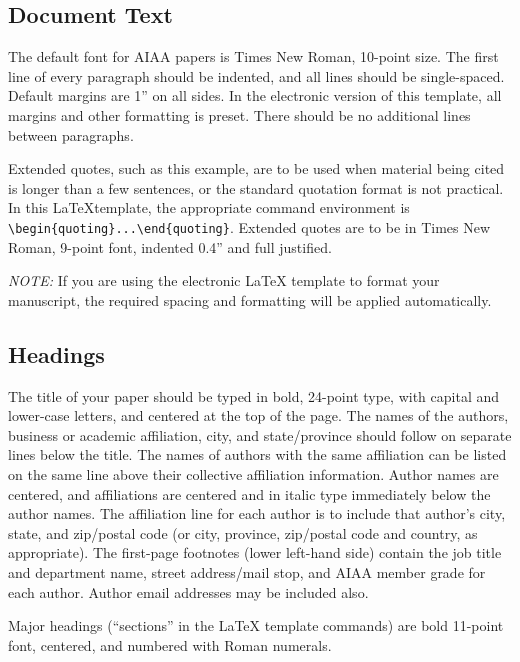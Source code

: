 \documentclass[conf]{new-aiaa}
\begin{document}
    \subsection{Document Text}

    The default font for AIAA papers is Times New Roman, 10-point size.  The first line of every paragraph should be indented, and all lines should be single-spaced. Default margins are 1'' on all sides. In the electronic version of this template, all margins and other formatting is preset. There should be no additional lines between paragraphs.
    
    \begin{quoting}
        Extended quotes, such as this example, are to be used when material being cited is longer than a few sentences, or the standard quotation format is not practical. In this \LaTeX template, the appropriate command environment is \verb|\begin{quoting}...\end{quoting}|. Extended quotes are to be in Times New Roman, 9-point font, indented 0.4'' and full justified.
    \end{quoting}
    
    \emph{NOTE:} If you are using the electronic \LaTeX{} template to format your manuscript, the required spacing and formatting will be applied automatically.
    
    \subsection{Headings}
    
    The title of your paper should be typed in bold, 24-point type, with capital and lower-case letters, and centered at the top of the page. The names of the authors, business or academic affiliation, city, and state/province should follow on separate lines below the title. The names of authors with the same affiliation can be listed on the same line above their collective affiliation information. Author names are centered, and affiliations are centered and in italic type immediately below the author names. The affiliation line for each author is to include that author’s city, state, and zip/postal code (or city, province, zip/postal code and country, as appropriate). The first-page footnotes (lower left-hand side) contain the job title and department name, street address/mail stop, and AIAA member grade for each author. Author email addresses may be included also.

    Major headings (``sections'' in the \LaTeX{} template commands) are bold 11-point font, centered, and numbered with Roman numerals.
    
\end{document}
